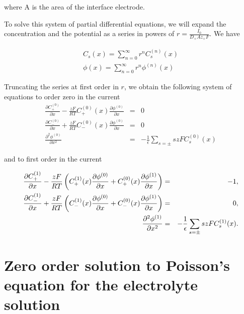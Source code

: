 where A is the area of the interface electrode. 

To solve this system of partial differential equations, we will expand the concentration and the potential as a series in powers of $r = \frac{I_0}{D_+Az_+ F}$. We have

\begin{eqnarray}
C_s(x) = \sum_{n=0}^{\infty}r^n C_s^{(n)}(x)\\
\phi(x) = \sum_{n=0}^{\infty}r^n \phi^{(n)}(x)
\end{eqnarray}

Truncating the series at first order in $r$, we obtain the following system of equations to order zero in the current
\begin{eqnarray}
\frac{\partial C^{(0)}_+}{\partial x}-\frac{zF}{RT}C^{(0)}_+(x)\frac{\partial \phi^{(0)}}{\partial x} &=& 0\\
\label{eq:concentration-diff-zero1}
\frac{\partial C^{(0)}_-}{\partial x}+\frac{zF}{RT}C^{(0)}_-(x)\frac{\partial \phi^{(0)}}{\partial x}&=& 0\\
\label{eq:concentration-diff-zero2}
\frac{\partial^2  \phi^{(0)}}{\partial x^2} &=& -\frac{1}{\epsilon}\sum_{s= \pm} szF C^{(0)}_{s}(x)
\label{eq:concentration-diff-zero3}
\end{eqnarray}

and to first order in the current

\begin{eqnarray}
\label{eq:first-order-system}
\frac{\partial C^{(1)}_+}{\partial x}-\frac{zF}{RT}\left({C^{(1)}_+(x)\frac{\partial \phi^{(0)}}{\partial x}+C^{(0)}_+(x)\frac{\partial \phi^{(1)}}{\partial x}}\right) &=& -1,\\
\label{eq:concentration-diff-first1}
\frac{\partial C^{(1)}_-}{\partial x}+\frac{zF}{RT}\left({C^{(1)}_-(x)\frac{\partial \phi^{(0)}}{\partial x}+C^{(0)}_-(x)\frac{\partial \phi^{(1)}}{\partial x}}\right)&=& 0,\\
\label{eq:concentration-diff-first2}
\frac{\partial^2  \phi^{(1)}}{\partial x^2} &=& -\frac{1}{\epsilon}\sum_{s= \pm} szF C^{(1)}_{s}(x).
\label{eq:concentration-diff-first3}
\end{eqnarray}








\newpage

\section{Zero order solution to Poisson's equation for the electrolyte solution}
\label{sec:zeroorderphi}

